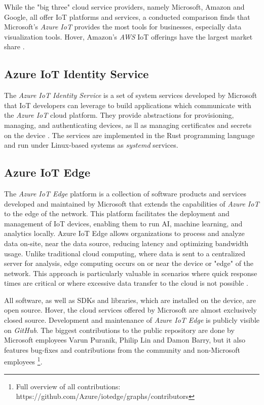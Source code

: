 While the "big three" cloud service providers, namely Microsoft, Amazon and
Google, all offer \ac{IoT} platforms and services, a conducted comparison finds
that Microsoft's \textit{Azure IoT} provides the most tools for businesses,
especially data visualization tools. Hover, Amazon's \textit{AWS} \ac{IoT}
offerings have the largest market share \cite{9116254}.

\subsection{Azure IoT Identity Service}
The \textit{Azure IoT Identity Service} is a set of system services developed
by Microsoft that \ac{IoT} developers can leverage to build applications which
communicate with the \textit{Azure IoT} cloud platform. They provide abstractions
for provisioning, managing, and authenticating devices, as ll as managing
certificates and secrets on the device \cite{aiiot}. The services are implemented
in the Rust programming language and run under Linux-based systems as \textit{systemd}
services.


\subsection{Azure IoT Edge}
The \textit{Azure IoT Edge} platform is a collection of software products and
services developed and maintained by Microsoft that extends the capabilities
of \textit{Azure IoT} to the edge of the network. This platform facilitates the
deployment and management of \ac{IoT} devices, enabling them to run \ac{AI},
machine learning, and analytics locally. Azure IoT Edge allows organizations to
process and analyze data on-site, near the data source, reducing latency and
optimizing bandwidth usage.
Unlike traditional cloud computing, where data is sent to a centralized server
for analysis, edge computing occurs on or near the device or "edge" of the
network. This approach is particularly valuable in scenarios where quick
response times are critical or where excessive data transfer to the cloud
is not possible \cite{msdoc-aziotedge}.

All software, as well as \ac{SDK}s and
libraries, which are installed on the device, are open source. Hover, the
cloud services offered by Microsoft are almost exclusively closed source.
Development and maintenance of \textit{Azure IoT Edge} is publicly visible on
\textit{GitHub}. The biggest contributions
to the public repository are done by Microsoft employees Varun Puranik,
Philip Lin and Damon Barry, but it also features bug-fixes and contributions
from the community and non-Microsoft employees
\footnote{Full overview of all contributions: https://github.com/Azure/iotedge/graphs/contributors}.


